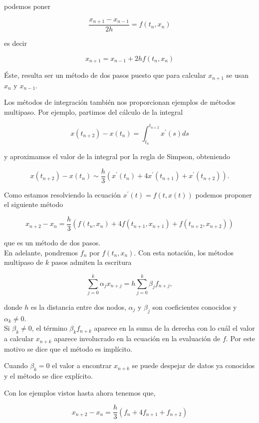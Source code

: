 \documentclass[10pt]{article}
\begin{document}
podemos poner

$$
\frac{x_{n+1}-x_{n-1}}{2 h}=f\left(t_{n}, x_{n}\right)
$$

es decir

$$
x_{n+1}=x_{n-1}+2 h f\left(t_{n}, x_{n}\right)
$$

Éste, resulta ser un método de dos pasos puesto que para calcular $x_{n+1}$ se usan $x_{n}$ y $x_{n-1}$.

Los métodos de integración también nos proporcionan ejemplos de métodos multipaso. Por ejemplo, partimos del cálculo de la integral

$$
x\left(t_{n+2}\right)-x\left(t_{n}\right)=\int_{t_{n}}^{t_{n+2}} x^{\prime}(s) d s
$$

y aproximamos el valor de la integral por la regla de Simpson, obteniendo

$$
x\left(t_{n+2}\right)-x\left(t_{n}\right) \sim \frac{h}{3}\left(x^{\prime}\left(t_{n}\right)+4 x^{\prime}\left(t_{n+1}\right)+x^{\prime}\left(t_{n+2}\right)\right) .
$$

Como estamos resolviendo la ecuación $x^{\prime}(t)=f(t, x(t))$ podemos proponer el siguiente método

$$
x_{n+2}-x_{n}=\frac{h}{3}\left(f\left(t_{n}, x_{n}\right)+4 f\left(t_{n+1}, x_{n+1}\right)+f\left(t_{n+2}, x_{n+2}\right)\right)
$$

que es un método de dos pasos.\\
En adelante, pondremos $f_{n}$ por $f\left(t_{n}, x_{n}\right)$. Con esta notación, los métodos multipaso de $k$ pasos admiten la escritura


\begin{equation*}
\sum_{j=0}^{k} \alpha_{j} x_{n+j}=h \sum_{j=0}^{k} \beta_{j} f_{n+j}, \tag{8.22}
\end{equation*}


donde $h$ es la distancia entre dos nodos, $\alpha_{j}$ y $\beta_{j}$ son coeficientes conocidos y $\alpha_{k} \neq 0$.\\
Si $\beta_{k} \neq 0$, el término $\beta_{k} f_{n+k}$ aparece en la suma de la derecha con lo cuál el valor a calcular $x_{n+k}$ aparece involucrado en la ecuación en la evaluación de $f$. Por este motivo se dice que el método es implícito.

Cuando $\beta_{k}=0$ el valor a encontrar $x_{n+k}$ se puede despejar de datos ya conocidos y el método se dice explícito.

Con los ejemplos vistos hasta ahora tenemos que,


\begin{equation*}
x_{n+2}-x_{n}=\frac{h}{3}\left(f_{n}+4 f_{n+1}+f_{n+2}\right) \tag{8.23}
\end{equation*}
\end{document}
